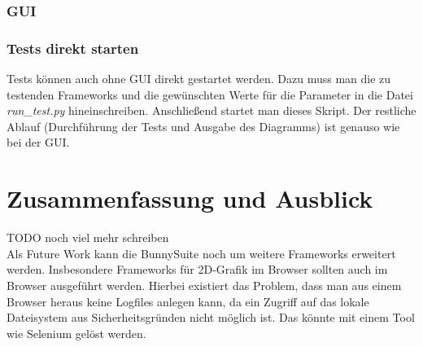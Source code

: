 \subsection{GUI}
\subsection{Tests direkt starten}
Tests können auch ohne GUI direkt gestartet werden. Dazu muss man die zu testenden Frameworks und die gewünschten Werte für die Parameter in die Datei \textit{run\_test.py} hineinschreiben. Anschließend startet man dieses Skript. Der restliche Ablauf (Durchführung der Tests und Ausgabe des Diagramms) ist genauso wie bei der GUI.

\chapter{Zusammenfassung und Ausblick}
TODO noch viel mehr schreiben
\\
Als Future Work kann die BunnySuite noch um weitere Frameworks erweitert werden. Insbesondere Frameworks für 2D-Grafik im Browser sollten auch im Browser ausgeführt werden. Hierbei existiert das Problem, dass man aus einem Browser heraus keine Logfiles anlegen kann, da ein Zugriff auf das lokale Dateisystem aus Sicherheitsgründen nicht möglich ist. Das könnte mit einem Tool wie Selenium gelöst werden.
